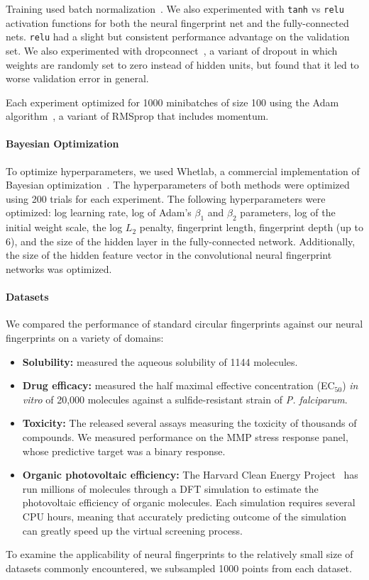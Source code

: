 \documentclass{article}
\begin{document}
Training used batch normalization~\citep{ioffe2015batch}.
We also experimented with \texttt{tanh} vs \texttt{relu} activation functions for both the neural fingerprint net and the fully-connected nets.
\texttt{relu} had a slight but consistent performance advantage on the validation set.
We also experimented with dropconnect~\citep{wan2013regularization}, a variant of dropout in which weights are randomly set to zero instead of hidden units, but found that it led to worse validation error in general.

Each experiment optimized for 1000 minibatches of size 100 using the Adam algorithm~\citep{Adam14}, a variant of RMSprop that includes momentum.

\paragraph{Bayesian Optimization}
To optimize hyperparameters, we used Whetlab, a commercial implementation of Bayesian optimization~\citep{snoek2012practical}.
The hyperparameters of both methods were optimized using 200 trials for each experiment.
The following hyperparameters were optimized: log learning rate, log of Adam's $\beta_1$ and $\beta_2$ parameters, log of the initial weight scale, the log $L_2$ penalty, fingerprint length, fingerprint depth (up to 6), and the size of the hidden layer in the fully-connected network.
Additionally, the size of the hidden feature vector in the convolutional neural fingerprint networks was optimized.

\paragraph{Datasets}
We compared the performance of standard circular fingerprints against our neural fingerprints on a variety of domains:
%
\begin{itemize}
\item {\bf Solubility:} \cite{delaney_data_2004} measured the aqueous solubility of 1144 molecules.
\item{\bf Drug efficacy:} \citet{gamo2010thousands} measured the half maximal effective concentration (EC$_{50}$) {\it in vitro} of 20,000 molecules against a sulfide-resistant strain of {\it P. falciparum}.
\item {\bf Toxicity:} The \citet{tox21} released several assays measuring the toxicity of thousands of compounds.
We measured performance on the MMP stress response panel, whose predictive target was a binary response.
\item {\bf Organic photovoltaic efficiency:} The Harvard Clean Energy Project~\citet{hachmann2011harvard} has run millions of molecules through a DFT simulation to estimate the photovoltaic efficiency of organic molecules.
Each simulation requires several CPU hours, meaning that accurately predicting outcome of the simulation can greatly speed up the virtual screening process.
\end{itemize}
%
To examine the applicability of neural fingerprints to the relatively small size of datasets commonly encountered, we subsampled 1000 points from each dataset.
\end{document}
